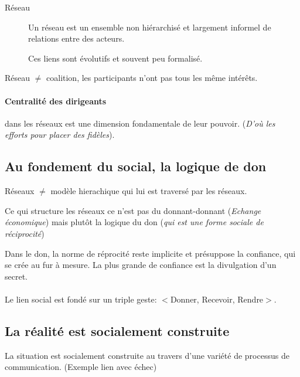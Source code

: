 \documentclass[11pt]{article} %
\begin{document}
\begin{description}
    \item[Réseau] Un réseau est un ensemble non hiérarchisé et
largement informel de relations entre des acteurs.

        Ces liens sont évolutifs et souvent peu formalisé.
\end{description}

Réseau $\neq$ coalition, les participants n'ont pas tous les même intérêts.

\paragraph{Centralité des dirigeants} dans les réseaux est une dimension
fondamentale de leur pouvoir. (\textit{D'où les efforts pour placer des
fidèles}). 

\subsection{Au fondement du social, la logique de don}
Réseaux $\neq$  modèle hierachique qui lui est traversé par les réseaux.

Ce qui structure les réseaux ce n'est pas du donnant-donnant
(\textit{Echange économique}) mais plutôt la
logique du don (\textit{qui est une forme sociale de réciprocité})

Dans le don, la norme de réprocité reste implicite et présuppose la
confiance, qui se crée au fur à mesure. La plus grande de confiance
est la divulgation d'un secret.


\paragraph{ }
Le lien social est fondé sur un triple geste: $<$Donner, Recevoir,
Rendre$>$.

\subsection{La réalité est socialement construite}

La situation est socialement construite au travers d'une variété de
processus de communication. (Exemple lien avec échec)
\end{document}
